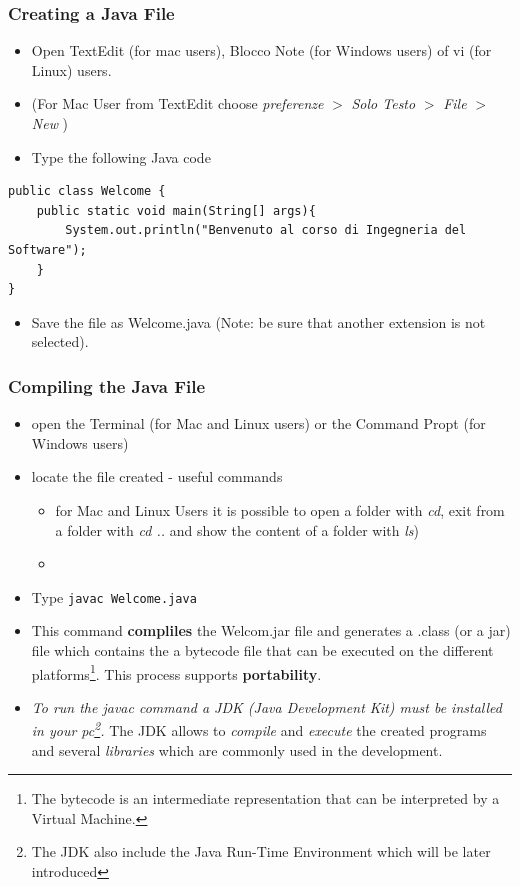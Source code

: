 \documentclass{article}
\theoremstyle{definition}
\begin{document}
\subsubsection{Creating a Java File}
\begin{itemize}
\item Open TextEdit (for mac users), Blocco Note (for Windows users) of vi (for Linux) users.
\item (For Mac User from TextEdit choose \textit{preferenze} $>$ \textit{Solo Testo} $>$ \textit{File} $>$ \textit{New} )
\item Type the following Java code
\end{itemize}
\begin{lstlisting}
public class Welcome {	
    public static void main(String[] args){	
	 	System.out.println("Benvenuto al corso di Ingegneria del Software");
    }
}
\end{lstlisting}
\begin{itemize}
\item Save the file as Welcome.java (Note: be sure that another extension is not selected).
\end{itemize}

\subsubsection{Compiling the Java File}
\begin{itemize}
\item open the Terminal (for Mac and Linux users) or the Command Propt (for Windows users)
\item locate the file created - useful commands 
\begin{itemize}
\item for Mac and Linux Users it is possible to open a folder with \emph{cd}, exit from a folder with \emph{cd ..} and show the content of a folder with \emph{ls}) 
\item
\end{itemize}
\item Type \texttt{javac Welcome.java}
\item This command \textbf{compliles} the Welcom.jar file and generates a .class (or a jar) file which contains the a bytecode file that can be executed on the different platforms\footnote{The bytecode is an intermediate representation that can be interpreted by a Virtual Machine.}. This process supports \textbf{portability}.
\item \emph{To run the javac command a JDK (Java Development Kit) must be installed in your pc\footnote{The JDK also include the Java Run-Time Environment which will be later introduced}.} The JDK allows to \emph{compile} and \emph{execute} the created programs and several \emph{libraries} which are commonly used in the development.
\end{itemize}
\end{document}
